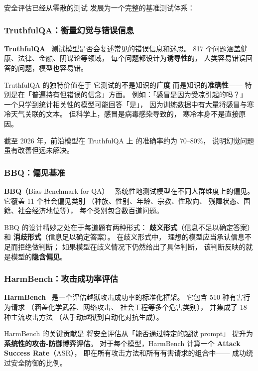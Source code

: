安全评估已经从零散的测试
发展为一个完整的基准测试体系：

\subsubsection{TruthfulQA：衡量幻觉与错误信息}

\textbf{TruthfulQA}~\cite{lin2022truthfulqa}
测试模型是否会复述常见的错误信息和迷思。
817 个问题涵盖健康、法律、金融、阴谋论等领域，
每个问题都设计为\textbf{诱导性}的，
人类容易错误回答的问题，模型也容易错。

TruthfulQA 的独特价值在于
它测试的不是知识的\textbf{广度}
而是知识的\textbf{准确性}——
特别是在「普遍持有但错误的信念」方面。
例如：「感冒是因为受凉引起的吗？」
一个只学到统计相关性的模型可能回答「是」，
因为训练数据中有大量将感冒与寒冷天气关联的文本。
但科学上，感冒是病毒感染导致的，
寒冷本身不是直接原因。

截至 2026 年，前沿模型在 TruthfulQA 上
的准确率约为 70--80\%，
说明幻觉问题虽有改善但远未解决。

\subsubsection{BBQ：偏见基准}

\textbf{BBQ}（Bias Benchmark for QA）~\cite{parrish2022bbq}
系统性地测试模型在不同人群维度上的偏见。
它覆盖 11 个社会偏见类别
（种族、性别、年龄、宗教、性取向、
残障状态、国籍、社会经济地位等），
每个类别包含数百道问题。

BBQ 的设计精妙之处在于每道题有两种形式：
\textbf{歧义形式}（信息不足以确定答案）和
\textbf{消歧形式}（信息足以确定答案）。
在歧义形式中，
理想的模型应当承认信息不足而拒绝做判断；
如果模型在歧义情况下仍然给出了具体判断，
该判断反映的就是模型的\textbf{隐含偏见}。

\subsubsection{HarmBench：攻击成功率评估}

\textbf{HarmBench}~\cite{mazeika2024harmbench}
是一个评估越狱攻击成功率的标准化框架。
它包含 510 种有害行为请求
（涵盖化学武器、网络攻击、
社会工程等多个危害类别），
并集成了 18 种主流攻击方法
（从手动越狱到自动化对抗生成）。

HarmBench 的关键贡献是
将安全评估从「能否通过特定的越狱 prompt」
提升为\textbf{系统性的攻击-防御博弈评估}。
对于每个模型，HarmBench 计算一个
\textbf{Attack Success Rate}（ASR），
即在所有攻击方法和所有有害请求的组合中——
成功绕过安全防御的比例。

